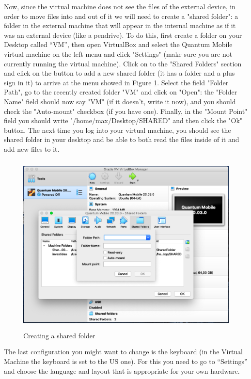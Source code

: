 \documentclass[12pt]{article}
\begin{document}
Now, since the virtual machine does not see the files of the external device, in
order to move files into and out of it we will need to create a "shared folder":
a folder in the external machine that will appear in the internal machine as if
it was an external device (like a pendrive).
To do this, first create a folder on your Desktop called “VM”, then open VirtualBox
and select the Quantum Mobile virtual machine on the left menu and click "Settings"
(make sure you are not currently running the virtual machine).
Click on to the "Shared Folders" section and click on the button to add a new shared
folder (it has a folder and a plus sign in it) to arrive at the menu showed in Figure \ref{shared_folder}.
Select the field "Folder Path", go to the recently created folder "VM" and click on
"Open": the "Folder Name" field should now say "VM" (if it doesn't, write it now),
and you should check the "Auto-mount" checkbox (if you have one).
Finally, in the "Mount Point" field you should write "/home/max/Desktop/SHARED"
and then click the "Ok" button.
The next time you log into your virtual machine, you should see the shared folder
in your desktop and be able to both read the files inside of it and add new
files to it.
\begin{figure}[h!]
\centering
\includegraphics[height=260pt]{shared_folder.png}
\caption{Creating a shared folder}
\label{shared_folder}
\end{figure}

The last configuration you might want to change is the keyboard (in the Virtual
Machine the keyboard is set to the US one). For this you need to go to “Settings”
and choose the language and layout that is appropriate for your own hardware.
\end{document}

